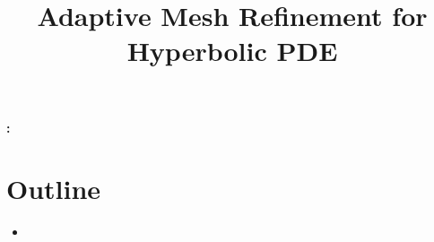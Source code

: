 \documentclass[12pt]{article}
\begin{document}
\title{\bf Adaptive Mesh Refinement for Hyperbolic PDE}
\author{}
\maketitle


{\bf \abstractname{:}} {\small}

\section{Outline}
\begin{itemize}
\item 


\end{itemize}
\end{document}
